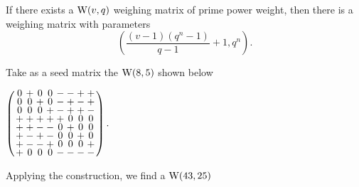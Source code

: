 \documentclass[../../../main]{subfiles}
\begin{document}
\begin{thm}
 If there exists a $\text{W}(v,q)$ weighing matrix of prime power weight, then there is a weighing matrix with parameters
 \begin{equation}
  \left(
  \frac{(v-1)(q^n-1)}{q-1} + 1, q^n
  \right).
 \end{equation}
\end{thm}

\begin{ex}
 Take as a seed matrix the $\text{W}(8,5)$ shown below
 \begin{defenum}
  \item $
  \arraycolsep=1.25pt\def\arraystretch{0.625}
  \left(\begin{array}{cccccccc}
0&+&0&0&-&-&+&+\\
0&0&+&0&-&+&-&+\\
0&0&0&+&-&+&+&-\\
+&+&+&+&+&0&0&0\\
+&+&-&-&0&+&0&0\\
+&-&+&-&0&0&+&0\\
+&-&-&+&0&0&0&+\\
+&0&0&0&-&-&-&-\\
  \end{array}\right).
  $
 \end{defenum}
 Applying the construction, we find a $\text{W}(43,25)$
 \begin{defenum}[resume]
  \item {}
\end{defenum}
\end{ex}
\end{document}
